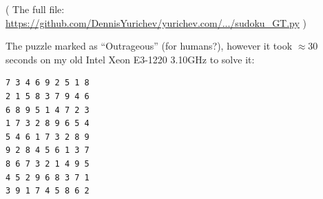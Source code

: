 ( The full file: \url{https://github.com/DennisYurichev/yurichev.com/.../sudoku_GT.py} )

The puzzle marked as ``Outrageous'' (for humans?), however it took $\approx 30$ seconds
on my old Intel Xeon E3-1220 3.10GHz to solve it:

\begin{lstlisting}
7 3 4 6 9 2 5 1 8
2 1 5 8 3 7 9 4 6
6 8 9 5 1 4 7 2 3
1 7 3 2 8 9 6 5 4
5 4 6 1 7 3 2 8 9
9 2 8 4 5 6 1 3 7
8 6 7 3 2 1 4 9 5
4 5 2 9 6 8 3 7 1
3 9 1 7 4 5 8 6 2
\end{lstlisting}


